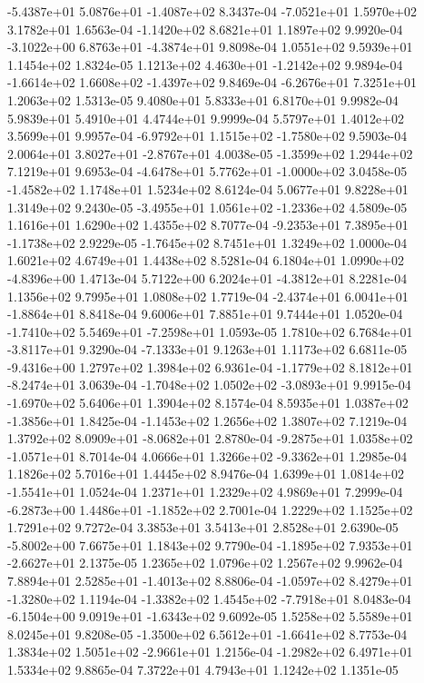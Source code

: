 -5.4387e+01  5.0876e+01 -1.4087e+02  8.3437e-04
-7.0521e+01  1.5970e+02  3.1782e+01  1.6563e-04
-1.1420e+02  8.6821e+01  1.1897e+02  9.9920e-04
-3.1022e+00  6.8763e+01 -4.3874e+01  9.8098e-04
1.0551e+02 9.5939e+01 1.1454e+02  1.8324e-05
 1.1213e+02  4.4630e+01 -1.2142e+02  9.9894e-04
-1.6614e+02  1.6608e+02 -1.4397e+02  9.8469e-04
-6.2676e+01  7.3251e+01  1.2063e+02  1.5313e-05
9.4080e+01 5.8333e+01 6.8170e+01  9.9982e-04
5.9839e+01 5.4910e+01 4.4744e+01  9.9999e-04
5.5797e+01 1.4012e+02 3.5699e+01  9.9957e-04
-6.9792e+01  1.1515e+02 -1.7580e+02  9.5903e-04
 2.0064e+01  3.8027e+01 -2.8767e+01  4.0038e-05
-1.3599e+02  1.2944e+02  7.1219e+01  9.6953e-04
-4.6478e+01  5.7762e+01 -1.0000e+02  3.0458e-05
-1.4582e+02  1.1748e+01  1.5234e+02  8.6124e-04
5.0677e+01 9.8228e+01 1.3149e+02  9.2430e-05
-3.4955e+01  1.0561e+02 -1.2336e+02  4.5809e-05
1.1616e+01 1.6290e+02 1.4355e+02  8.7077e-04
-9.2353e+01  7.3895e+01 -1.1738e+02  2.9229e-05
-1.7645e+02  8.7451e+01  1.3249e+02  1.0000e-04
1.6021e+02 4.6749e+01 1.4438e+02  8.5281e-04
 6.1804e+01  1.0990e+02 -4.8396e+00  1.4713e-04
 5.7122e+00  6.2024e+01 -4.3812e+01  8.2281e-04
1.1356e+02 9.7995e+01 1.0808e+02  1.7719e-04
-2.4374e+01  6.0041e+01 -1.8864e+01  8.8418e-04
9.6006e+01 7.8851e+01 9.7444e+01  1.0520e-04
-1.7410e+02  5.5469e+01 -7.2598e+01  1.0593e-05
 1.7810e+02  6.7684e+01 -3.8117e+01  9.3290e-04
-7.1333e+01  9.1263e+01  1.1173e+02  6.6811e-05
-9.4316e+00  1.2797e+02  1.3984e+02  6.9361e-04
-1.1779e+02  8.1812e+01 -8.2474e+01  3.0639e-04
-1.7048e+02  1.0502e+02 -3.0893e+01  9.9915e-04
-1.6970e+02  5.6406e+01  1.3904e+02  8.1574e-04
 8.5935e+01  1.0387e+02 -1.3856e+01  1.8425e-04
-1.1453e+02  1.2656e+02  1.3807e+02  7.1219e-04
 1.3792e+02  8.0909e+01 -8.0682e+01  2.8780e-04
-9.2875e+01  1.0358e+02 -1.0571e+01  8.7014e-04
 4.0666e+01  1.3266e+02 -9.3362e+01  1.2985e-04
1.1826e+02 5.7016e+01 1.4445e+02  8.9476e-04
 1.6399e+01  1.0814e+02 -1.5541e+01  1.0524e-04
1.2371e+01 1.2329e+02 4.9869e+01  7.2999e-04
-6.2873e+00  1.4486e+01 -1.1852e+02  2.7001e-04
1.2229e+02 1.1525e+02 1.7291e+02  9.7272e-04
3.3853e+01 3.5413e+01 2.8528e+01  2.6390e-05
-5.8002e+00  7.6675e+01  1.1843e+02  9.7790e-04
-1.1895e+02  7.9353e+01 -2.6627e+01  2.1375e-05
1.2365e+02 1.0796e+02 1.2567e+02  9.9962e-04
 7.8894e+01  2.5285e+01 -1.4013e+02  8.8806e-04
-1.0597e+02  8.4279e+01 -1.3280e+02  1.1194e-04
-1.3382e+02  1.4545e+02 -7.7918e+01  8.0483e-04
-6.1504e+00  9.0919e+01 -1.6343e+02  9.6092e-05
1.5258e+02 5.5589e+01 8.0245e+01  9.8208e-05
-1.3500e+02  6.5612e+01 -1.6641e+02  8.7753e-04
 1.3834e+02  1.5051e+02 -2.9661e+01  1.2156e-04
-1.2982e+02  6.4971e+01  1.5334e+02  9.8865e-04
7.3722e+01 4.7943e+01 1.1242e+02  1.1351e-05

